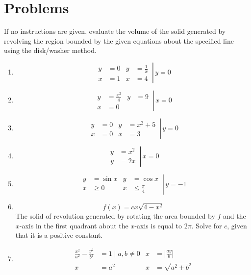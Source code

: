\documentclass[12pt, A4]{report}
\begin{document}
		\section*{Problems}
			If no instructions are given, evaluate the volume of the solid generated by revolving the region bounded by the given equations about the specified line using the disk/washer method.
			\begin{enumerate}
				\item
					\[
						\left.\begin{aligned}
							y &= 0 &
								y &= \frac{1}{x} \\
							x &= 1 &
								x &= 4
						\end{aligned}\,\right|\, y = 0
					\]
				\item
					\[
						\left.\begin{aligned}
							y &= \frac{x^2}{4} &
								y &= 9 \\
							x &= 0
						\end{aligned}\,\right|\, x = 0
					\]
				\item
					\[
						\left.\begin{aligned}
							y &= 0 & 
								y &= x^2 + 5 \\
							x &= 0 &
								x &= 3
						\end{aligned}\,\right|\, y = 0
					\]
				\item
					\[
						\left.\begin{aligned}
							y &= x^2 \\
							y &= 2x 
						\end{aligned}\,\right|\, x = 0
					\]
				\item
					\[
						\left.\begin{aligned}
							y &= \sin x &
								y &= \cos x \\
							x &\ge 0 & 
								x &\le \frac{\pi}{4}
						\end{aligned}\,\right|\, y = -1
					\]
				\item
					\[f(x) = cx\sqrt{4 - x^2}\]
					The solid of revolution generated by rotating the area bounded by $f$ and the $x$-axis in the first quadrant about the $x$-axis is equal to $2\pi$. Solve for $c$, given that it is a positive constant.
				\item
					\[
						\left.\begin{aligned}
							\frac{x^2}{a^2} - \frac{y^2}{b^2} &= 1 \mid a, b \ne 0 &
								x &= \left|\frac{ay}{b}\right| \\
							x &= a^2 &
								x &= \sqrt{a^2 + b^2}

\end{aligned}\]
\end{enumerate}
\end{document}
